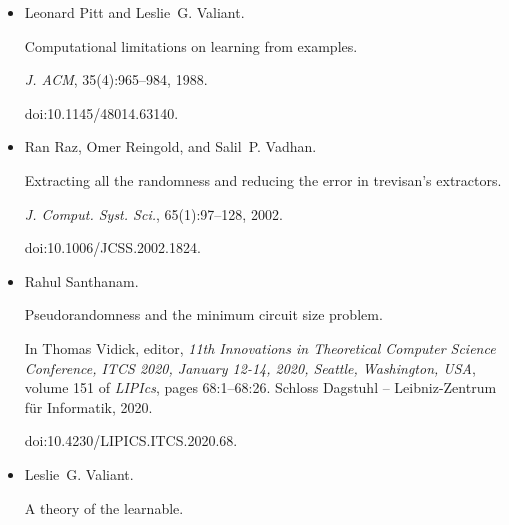 \documentclass[10pt,a4paper]{article}
\begin{document}
\begin{itemize}
Shien Jin Ong and Salil P. Vadhan.


Zero knowledge and soundness are symmetric.


In Moni Naor, editor, \emph{Advances in Cryptology – EUROCRYPT
2007, 26th Annual International Conference on the Theory and Applications of
Cryptographic Techniques, Barcelona, Spain, May 20-24, 2007, Proceedings},
volume 4515 of \emph{Lecture Notes in Computer Science}, pages 187–209.
Springer, 2007.


doi:10.1007/978-3-540-72540-4\_11.





\item[] 
[43]

Leonard Pitt and Leslie G. Valiant.


Computational limitations on learning from examples.


\emph{J. ACM}, 35(4):965–984, 1988.


doi:10.1145/48014.63140.





\item[] 
[44]

Ran Raz, Omer Reingold, and Salil P. Vadhan.


Extracting all the randomness and reducing the error in trevisan’s
extractors.


\emph{J. Comput. Syst. Sci.}, 65(1):97–128, 2002.


doi:10.1006/JCSS.2002.1824.





\item[] 
[45]

Rahul Santhanam.


Pseudorandomness and the minimum circuit size problem.


In Thomas Vidick, editor, \emph{11th Innovations in Theoretical
Computer Science Conference, ITCS 2020, January 12-14, 2020, Seattle,
Washington, USA}, volume 151 of \emph{LIPIcs}, pages 68:1–68:26. Schloss
Dagstuhl – Leibniz-Zentrum für Informatik, 2020.


doi:10.4230/LIPICS.ITCS.2020.68.





\item[] 
[46]

Leslie G. Valiant.


A theory of the learnable.



\end{itemize}
\end{document}
